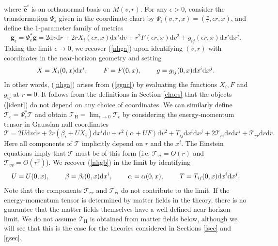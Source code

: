 \documentclass[11pt, reqno]{amsart}
\theoremstyle{plain}
\theoremstyle{definition}
\numberwithin{equation}{section}
\begin{document}
where $\hat{\textbf{e}}^i$ is an orthonormal basis on $M(v,r)$. For any $\epsilon > 0$, consider the transformation $\Psi_\epsilon$ given in the coordinate chart by $\Psi_\epsilon(v, r,x) = (\frac{v}{\epsilon},\epsilon r,x)$, and define the 1-parameter family of metrics
\begin{equation*}
    \textbf{g}_\epsilon = \Psi_\epsilon^*\textbf{g} = 2\text{d}v\text{d}r + 2rX_i(\epsilon r,x)\text{d}x^i\text{d}v + r^2 F(\epsilon r,x)\text{d}v^2 + g_{ij}(\epsilon r,x)\text{d}x^i\text{d}x^j.
\end{equation*}
Taking the limit $\epsilon \to 0$, we recover (\ref{nhga}) upon identifying $(v,r)$ with coordinates in the near-horizon geometry and setting 
\begin{equation} \label{ident}
    X = X_i(0,x)\text{d}x^i, \hspace{.8 cm} F = F(0,x), \hspace{.8cm} g = g_{ij}(0,x)\text{d}x^i\text{d}x^j.
\end{equation}
In other words, (\ref{nhga}) arises from (\ref{ggnc}) by evaluating the functions $X_i, F$ and $g_{ij}$ at $r = 0$.
It follows from the definitions in Section \ref{ehors} that the objects (\ref{ident}) do not depend on any choice of coordinates. We can similarly define $\mathcal{T}_\epsilon = \Psi_\epsilon^*\mathcal{T}$ and obtain $\mathcal{T}_{\text{H}} = \lim_{\epsilon \to 0}\mathcal{T}_\epsilon$ by considering the energy-momentum tensor in Gaussian null coordinates
\begin{equation}
    \mathcal{T} = 2U\text{d}v\text{d}r + 2r(\beta_i + UX_i)\text{d}x^i\text{d}v + r^2(\alpha+UF)\text{d}v^2 + T_{ij}\text{d}x^i\text{d}x^j + 2\mathcal{T}_{ri}\text{d}r\text{d}x^i + \mathcal{T}_{rr}\text{d}r\text{d}r.
\end{equation}
Here all components of $\mathcal{T}$ implicitly depend on $r$ and the $x^i$. The Einstein equations imply that $\mathcal{T}$ must be of this form (i.e. $\mathcal{T}_{vi} = O(r)$ and $\mathcal{T}_{vv} = O(r^2)$). We recover (\ref{nhgb}) in the limit by identifying 
\begin{equation}
    U = U(0,x), \hspace{.8cm} \beta = \beta_i(0,x)\text{d}x^i, \hspace{.8cm}\alpha = \alpha(0,x), \hspace{.8cm} T = T_{ij}(0,x)\text{d}x^i\text{d}x^j.
\end{equation}
Note that the components $\mathcal{T}_{rr}$ and $\mathcal{T}_{ri}$ do not contribute to the limit. If the energy-momentum tensor is determined by matter fields in the theory, there is no guarantee that the matter fields themselves have a well-defined near-horizon limit. We do not assume $\mathcal{T}_\text{H}$ is obtained from matter fields below, although we will see that this is the case for the theories considered in Sections \ref{fsec} and \ref{gsec}.
\end{document}
